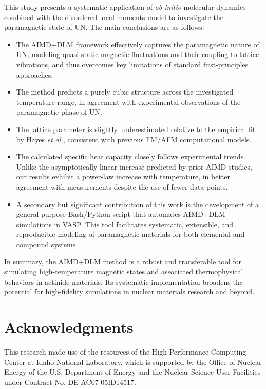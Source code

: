 \documentclass[preprint, 12pt]{elsarticle}
\newcommand{\?}{\stackrel{?}{=}}
\begin{document}
This study presents a systematic application of \textit{ab initio} molecular dynamics combined with the disordered local moments model to investigate the paramagnetic state of UN. The main conclusions are as follows:

\begin{itemize}
    \item The AIMD+DLM framework effectively captures the paramagnetic nature of UN, modeling quasi-static magnetic fluctuations and their coupling to lattice vibrations, and thus overcomes key limitations of standard first-principles approaches.
    
    \item The method predicts a purely cubic structure across the investigated temperature range, in agreement with experimental observations of the paramagnetic phase of UN.
    
    \item The lattice parameter is slightly underestimated relative to the empirical fit by Hayes \textit{et al.}, consistent with previous FM/AFM computational models.
    
    \item The calculated specific heat capacity closely follows experimental trends. Unlike the asymptotically linear increase predicted by prior AIMD studies, our results exhibit a power-law increase with temperature, in better agreement with measurements despite the use of fewer data points.
    
    \item A secondary but significant contribution of this work is the development of a general-purpose Bash/Python script that automates AIMD+DLM simulations in VASP. This tool facilitates systematic, extensible, and reproducible modeling of paramagnetic materials for both elemental and compound systems.
\end{itemize}

In summary, the AIMD+DLM method is a robust and transferable tool for simulating high-temperature magnetic states and associated thermophysical behaviors in actinide materials. Its systematic implementation broadens the potential for high-fidelity simulations in nuclear materials research and beyond.

\section{Acknowledgments}

This research made use of the resources of the High-Performance Computing Center at Idaho National Laboratory, which is supported by the Office of Nuclear Energy of the U.S. Department of Energy and the Nuclear Science User Facilities under Contract No. DE-AC07-05ID14517.
\end{document}

